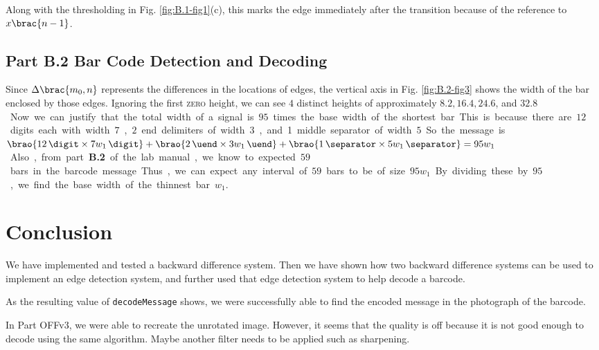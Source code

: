 \documentclass[conference]{../lib/IEEEtran}
\DeclarePairedDelimiter\brao()%
\DeclarePairedDelimiter\brac[]%
\begin{document}
Along with the thresholding in Fig. \ref{fig:B.1-fig1}(c), this marks the edge immediately after the transition because of the reference to \(x\brac{n - 1}\).

\subsection{Part B.2 Bar Code Detection and Decoding}

Since \(\Delta\brac{m_0, n}\) represents the differences in the locations of edges, the vertical axis in Fig. \ref{fig:B.2-fig3} shows the width of the bar enclosed by those edges. Ignoring the first \textsc{zero} height, we can see \(4\) distinct heights of approximately \(8.2, 16.4, 24.6\), and \(32.8\) \si\sample.

Now we can justify that the total width of a signal is \(95\) times the base width of the shortest bar. This is because there are \(12\) digits each with width \(7\), \(2\) end delimiters of width \(3\), and 1 middle separator of width \(5\). So the message is \(\brao{\SI{12}\digit \times \SI{7w_1}{\per\digit}} + \brao{\SI{2}\uend \times \SI{3w_1}{\per\uend}} + \brao{\SI{1}\separator \times \SI{5w_1}{\per\separator}} = 95w_1\). Also, from part \textbf{B.2} of the lab manual, we know to expected \(59\) bars in the barcode message. Thus, we can expect any interval of \(59\) bars to be of size \(95w_1\). By dividing these by \(95\), we find the base width of the thinnest bar \(w_1\).

\section{Conclusion}

We have implemented and tested a backward difference system. Then we have shown how two backward difference systems can be used to implement an edge detection system, and further used that edge detection system to help decode a barcode.

As the resulting value of \texttt{decodeMessage} shows, we were successfully able to find the encoded message in the photograph of the barcode.

In Part OFFv3, we were able to recreate the unrotated image. However, it seems that the quality is off because it is not good enough to decode using the same algorithm. Maybe another filter needs to be applied such as sharpening.
\end{document}
